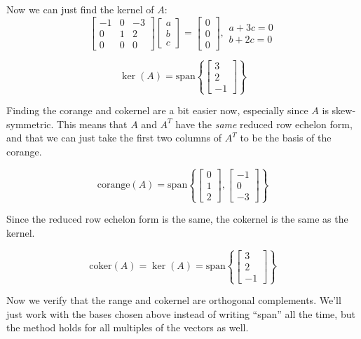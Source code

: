 \documentclass[10pt,letterpaper]{article}
\begin{document}
	Now we can just find the kernel of $A$: 
	$$
	\begin{bmatrix}
	-1 & 0 & -3 \\ 0 & 1 & 2 \\  0 & 0 & 0
	\end{bmatrix} \begin{bmatrix}
	a \\ b \\ c
	\end{bmatrix} = \begin{bmatrix}
	0 \\ 0 \\0 
	\end{bmatrix}, \begin{array}{c} a + 3c = 0 \\ b+2c = 0
	\end{array}
	$$
	
	$$
	\boxed{\ker(A) = \text{span} \left\lbrace \begin{bmatrix}
	3 \\ 2 \\ -1
	\end{bmatrix} \right\rbrace}
	$$
	
	Finding the corange and cokernel are a bit easier now, especially since $A$ is skew-symmetric.  This means that $A$ and $A^T$ have the \textit{same} reduced row echelon form, and that we can just take the first two columns of $A^T$ to be the basis of the corange. 
	
	
	$$
	\boxed{\text{corange}(A) = \text{span} \left\lbrace \begin{bmatrix}
		0 \\ 1 \\ 2
	\end{bmatrix}, \begin{bmatrix}
	-1 \\ 0 \\ -3
	\end{bmatrix} \right\rbrace}
	$$
	
	Since the reduced row echelon form is the same, the cokernel is the same as the kernel. 
	
	$$
	\boxed{\text{coker} (A) = \ker(A) = \text{span} \left\lbrace \begin{bmatrix}
	3 \\ 2 \\ -1
	\end{bmatrix} \right\rbrace}
	$$
	
	Now we verify that the range and cokernel are orthogonal complements. We'll just work with the bases chosen above instead of writing ``span'' all the time, but the method holds for all multiples of the vectors as well. 
	
\end{document}
